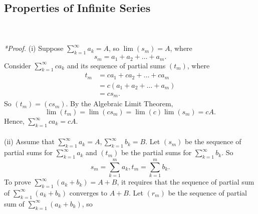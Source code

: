 \documentclass{article}
\begin{document}
            \subsection{Properties of Infinite Series}
            \\ \\
            \textit{*Proof.} (i) Suppose $\sum_{k=1}^\infty a_k = A$, so $\lim(s_m)=A$, where
            \begin{equation*}
                s_m = a_1 + a_2 + \dots + a_m.
            \end{equation*}
            Consider $\sum_{k=1}^\infty ca_k$ and its sequence of partial sums $(t_m)$, where 
            \begin{align*}
                t_m & = ca_1 + ca_2 + \dots + ca_m \\
                & = c(a_1+a_2+\dots+a_m) \\
                & = cs_m.
            \end{align*}
            So $(t_m)=(cs_m)$. By the Algebraic Limit Theorem,
            \begin{equation*}
                \lim(t_m) = \lim(cs_m) = \lim(c)\lim(s_m) = cA.
            \end{equation*}
            Hence, $\sum_{k=1}^\infty ca_k = cA$. \\ \\
            (ii) Assume that $\sum_{k=1}^\infty a_k=A, \sum_{k=1}^\infty b_k=B$. Let $(s_m)$ be the sequence of partial sums for $\sum_{k=1}^\infty a_k$ and $(t_m)$ be the partial sums for $\sum_{k=1}^\infty b_k$. So
            \begin{equation*}
                s_m = \sum_{k=1}^m a_k, t_m = \sum_{k=1}^m b_k.
            \end{equation*}
            To prove $\sum_{k=1}^\infty (a_k+b_k)=A+B$, it requires that the sequence of partial sum of $\sum_{k=1}^\infty (a_k+b_k)$ converges to $A+B$. Let $(r_m)$ be the sequence of partial sum of $\sum_{k=1}^\infty (a_k+b_k)$, so
\end{document}
